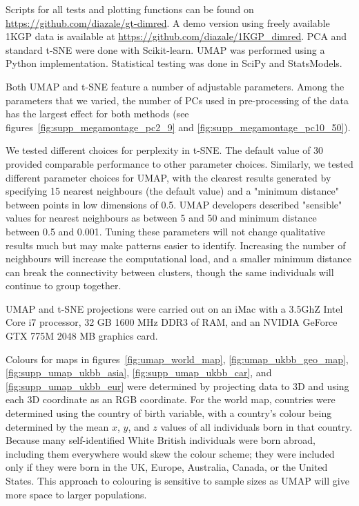 \documentclass[12pt]{pnas-new}
\begin{document}
{Scripts for all tests and plotting functions can be found on \url{https://github.com/diazale/gt-dimred}. A demo version using freely available 1KGP data is available at \url{https://github.com/diazale/1KGP_dimred}. PCA and standard t-SNE were done with Scikit-learn\cite{scikit-learn}. UMAP was performed using a Python implementation\cite{2018arXivUMAP}. Statistical testing was done in SciPy\cite{scipy} and StatsModels\cite{seabold2010statsmodels}.  

Both UMAP and t-SNE feature a number of adjustable parameters. Among the parameters that we varied, the number of PCs used in pre-processing of the data has the largest effect for both methods (see figures~\ref{fig:supp_megamontage_pc2_9} and \ref{fig:supp_megamontage_pc10_50}). 

We tested different choices for perplexity in t-SNE. The default value of 30 provided comparable performance to other parameter choices.  Similarly, we tested different parameter choices for UMAP, with the clearest results generated by specifying 15 nearest neighbours (the default value) and a "minimum distance" between points in low dimensions of 0.5. UMAP developers described "sensible" values for nearest neighbours as between 5 and 50 and minimum distance between 0.5 and 0.001. Tuning these parameters will not change qualitative results much but may make patterns easier to identify. Increasing the number of neighbours will increase the computational load, and a smaller minimum distance can break the connectivity between clusters, though the same individuals will continue to group together.

UMAP and t-SNE projections were carried out on an iMac with a 3.5GhZ Intel Core i7 processor, 32 GB 1600 MHz DDR3 of RAM, and an NVIDIA GeForce GTX 775M 2048 MB graphics card.

Colours for maps in figures~\ref{fig:umap_world_map}, \ref{fig:umap_ukbb_geo_map}, \ref{fig:supp_umap_ukbb_asia}, \ref{fig:supp_umap_ukbb_car}, and \ref{fig:supp_umap_ukbb_eur} were determined by projecting data to 3D and using each 3D coordinate as an RGB coordinate. For the world map, countries were determined using the country of birth variable, with a country's colour being determined by the mean $x$, $y$, and $z$ values of all individuals born in that country. Because many self-identified White British individuals were born abroad, including them everywhere would skew the colour scheme; they were included only if they were born in the UK, Europe, Australia, Canada, or the United States. This approach to colouring is sensitive to sample sizes as UMAP will give more space to larger populations. 

}
\end{document}
